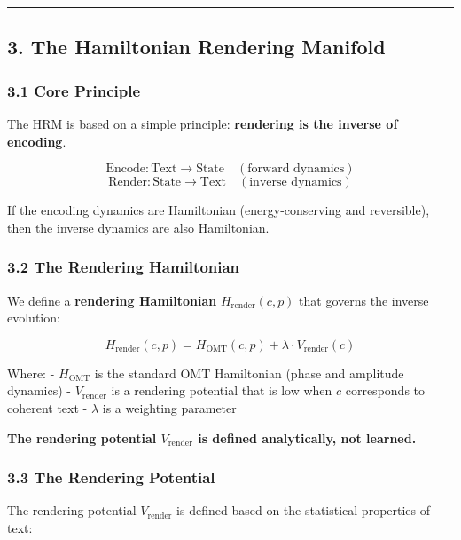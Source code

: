 \documentclass[
  11pt,
  a4paper,
]{article}
\begin{document}
\begin{center}\rule{0.5\linewidth}{0.5pt}\end{center}

\subsection{3. The Hamiltonian Rendering
Manifold}\label{the-hamiltonian-rendering-manifold}

\subsubsection{3.1 Core Principle}\label{core-principle}

The HRM is based on a simple principle: \textbf{rendering is the inverse
of encoding}.

\[
\text{Encode}: \text{Text} \rightarrow \text{State} \quad (\text{forward dynamics})
\] \[
\text{Render}: \text{State} \rightarrow \text{Text} \quad (\text{inverse dynamics})
\]

If the encoding dynamics are Hamiltonian (energy-conserving and
reversible), then the inverse dynamics are also Hamiltonian.

\subsubsection{3.2 The Rendering
Hamiltonian}\label{the-rendering-hamiltonian}

We define a \textbf{rendering Hamiltonian} \(H_{\text{render}}(c, p)\)
that governs the inverse evolution:

\[
H_{\text{render}}(c, p) = H_{\text{OMT}}(c, p) + \lambda \cdot V_{\text{render}}(c)
\]

Where: - \(H_{\text{OMT}}\) is the standard OMT Hamiltonian (phase and
amplitude dynamics) - \(V_{\text{render}}\) is a rendering potential
that is low when \(c\) corresponds to coherent text - \(\lambda\) is a
weighting parameter

\textbf{The rendering potential \(V_{\text{render}}\) is defined
analytically, not learned.}

\subsubsection{3.3 The Rendering
Potential}\label{the-rendering-potential}

The rendering potential \(V_{\text{render}}\) is defined based on the
statistical properties of text:
\end{document}
